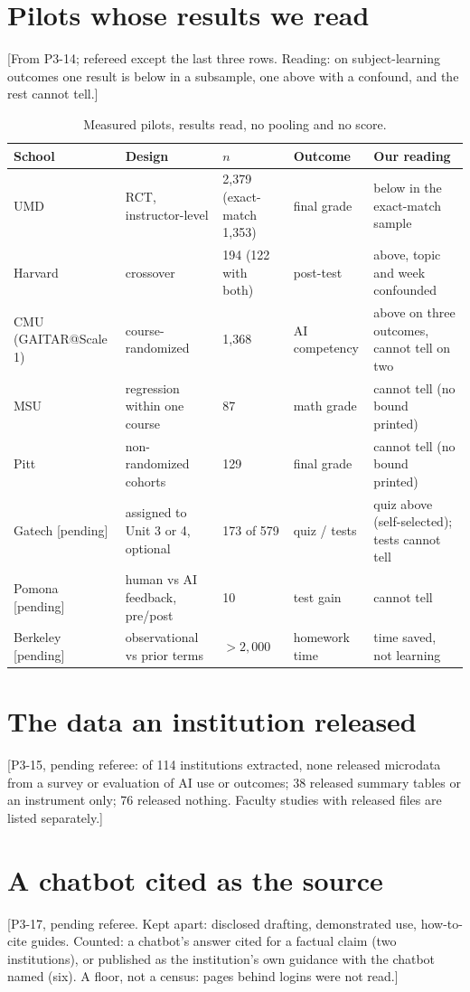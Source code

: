 \documentclass[11pt]{article}
\newcommand{\proof}[1]{{\color{red}\textsf{[#1]}}}
\begin{document}
\section{Pilots whose results we read}
\proof{From P3-14; refereed except the last three rows. Reading: on subject-learning outcomes one result is below in a subsample, one above with a confound, and the rest cannot tell.}
\begin{table}[h]\centering\footnotesize
\begin{tabular}{p{2.3cm}p{3.4cm}p{1.6cm}p{2.2cm}p{4.2cm}}\toprule
School & Design & $n$ & Outcome & Our reading\\\midrule
UMD & RCT, instructor-level & 2{,}379 (exact-match 1{,}353) & final grade & below in the exact-match sample\\
Harvard & crossover & 194 (122 with both) & post-test & above, topic and week confounded\\
CMU (GAITAR@Scale 1) & course-randomized & 1{,}368 & AI competency & above on three outcomes, cannot tell on two\\
MSU & regression within one course & 87 & math grade & cannot tell (no bound printed)\\
Pitt & non-randomized cohorts & 129 & final grade & cannot tell (no bound printed)\\
Gatech \proof{pending} & assigned to Unit 3 or 4, optional & 173 of 579 & quiz / tests & quiz above (self-selected); tests cannot tell\\
Pomona \proof{pending} & human vs AI feedback, pre/post & 10 & test gain & cannot tell\\
Berkeley \proof{pending} & observational vs prior terms & $>2{,}000$ & homework time & time saved, not learning\\\bottomrule
\end{tabular}
\caption{Measured pilots, results read, no pooling and no score.}\label{tab:pilots}
\end{table}

\section{The data an institution released}
\proof{P3-15, pending referee: of 114 institutions extracted, none released microdata from a survey or evaluation of AI use or outcomes; 38 released summary tables or an instrument only; 76 released nothing. Faculty studies with released files are listed separately.}

\section{A chatbot cited as the source}
\proof{P3-17, pending referee. Kept apart: disclosed drafting, demonstrated use, how-to-cite guides. Counted: a chatbot's answer cited for a factual claim (two institutions), or published as the institution's own guidance with the chatbot named (six). A floor, not a census: pages behind logins were not read.}
\end{document}
